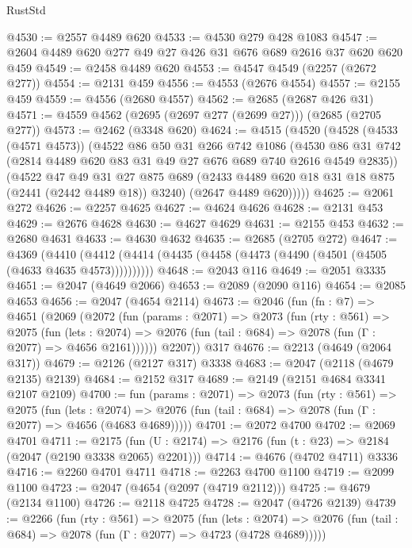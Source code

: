 \begin{lexlean}{RustStd}
\begin{coremodule}
@4530 := @2557 @4489 @620
@4533 := @4530 @279 @428 @1083
@4547 := @2604 @4489 @620 @277 @49 @27 @426 @31 @676 @689 @2616 @37 @620 @620 @459
@4549 := @2458 @4489 @620
@4553 := @4547 @4549 (@2257 (@2672 @277))
@4554 := @2131 @459
@4556 := @4553 (@2676 @4554)
@4557 := @2155 @459
@4559 := @4556 (@2680 @4557)
@4562 := @2685 (@2687 @426 @31)
@4571 := @4559 @4562 (@2695 (@2697 @277 (@2699 @27))) (@2685 (@2705 @277))
@4573 := @2462 (@3348 @620)
@4624 := @4515
    (@4520
      (@4528
        (@4533 (@4571 @4573))
        (@4522
          @86
          @50
          @31
          @266
          @742
          @1086
          (@4530 @86 @31 @742 (@2814 @4489 @620 @83 @31 @49 @27 @676 @689 @740 @2616 @4549 @2835))
          (@4522
            @47
            @49
            @31
            @27
            @875
            @689
            (@2433 @4489 @620 @18 @31 @18 @875 (@2441 (@2442 @4489 @18)) @3240)
            (@2647 @4489 @620)))))
@4625 := @2061 @272
@4626 := @2257 @4625
@4627 := @4624 @4626
@4628 := @2131 @453
@4629 := @2676 @4628
@4630 := @4627 @4629
@4631 := @2155 @453
@4632 := @2680 @4631
@4633 := @4630 @4632
@4635 := @2685 (@2705 @272)
@4647 := @4369
    (@4410 (@4412 (@4414 (@4435 (@4458 (@4473 (@4490 (@4501 (@4505 (@4633 @4635 @4573))))))))))
@4648 := @2043 @116
@4649 := @2051 @3335
@4651 := @2047 (@4649 @2066)
@4653 := @2089 (@2090 @116)
@4654 := @2085 @4653
@4656 := @2047 (@4654 @2114)
@4673 := @2046
    (fun (fn : @7) =>
    @4651
      (@2069
        (@2072
          (fun (params : @2071) =>
          @2073
            (fun (rty : @561) =>
            @2075
              (fun (lets : @2074) =>
              @2076 (fun (tail : @684) => @2078 (fun (Γ : @2077) => @4656 @2161))))))
        @2207))
    @317
@4676 := @2213 (@4649 (@2064 @317))
@4679 := @2126 (@2127 @317) @3338
@4683 := @2047 (@2118 (@4679 @2135) @2139)
@4684 := @2152 @317
@4689 := @2149 (@2151 @4684 @3341 @2107 @2109)
@4700 := fun (params : @2071) =>
  @2073
    (fun (rty : @561) =>
    @2075
      (fun (lets : @2074) =>
      @2076 (fun (tail : @684) => @2078 (fun (Γ : @2077) => @4656 (@4683 @4689)))))
@4701 := @2072 @4700
@4702 := @2069 @4701
@4711 := @2175 (fun (U : @2174) => @2176 (fun (t : @23) => @2184 (@2047 (@2190 @3338 @2065) @2201)))
@4714 := @4676 (@4702 @4711) @3336
@4716 := @2260 @4701 @4711
@4718 := @2263 @4700 @1100
@4719 := @2099 @1100
@4723 := @2047 (@4654 (@2097 (@4719 @2112)))
@4725 := @4679 (@2134 @1100)
@4726 := @2118 @4725
@4728 := @2047 (@4726 @2139)
@4739 := @2266
    (fun (rty : @561) =>
    @2075
      (fun (lets : @2074) =>
      @2076 (fun (tail : @684) => @2078 (fun (Γ : @2077) => @4723 (@4728 @4689)))))

\end{coremodule}
\end{lexlean}
